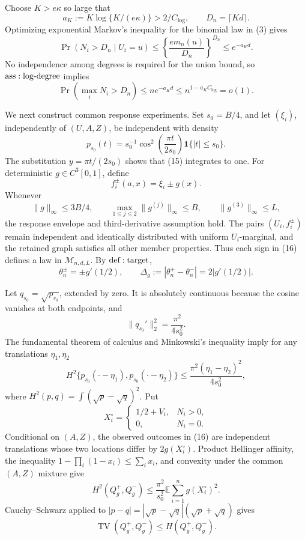 Choose \(K>e\kappa\) so large that
\[
 a_K:=K\log\{K/(e\kappa)\}>2/C_{\log},
 \qquad D_n=\lceil Kd\rceil.
\tag{13}
\]
Optimizing exponential Markov's inequality for the binomial law in (3) gives
\[
 \Pr(N_i>D_n\mid U_i=u)
 \leq\left\{\frac{em_n(u)}{D_n}\right\}^{D_n}
 \leq e^{-a_Kd}.
\]
No independence among degrees is required for the union bound, so \({\rm ass:log\text{-}degree}\) implies
\[
 \Pr\left(\max_iN_i>D_n\right)\leq ne^{-a_Kd}
 \leq n^{1-a_KC_{\log}}=o(1).
\tag{14}
\]

We next construct common response experiments.  Set \(s_0=B/4\), and let \((\xi_i)\), independently of \((U,A,Z)\), be independent with density
\[
 p_{s_0}(t)=s_0^{-1}\cos^2\!\left(\frac{\pi t}{2s_0}\right)
 \mathbf1\{|t|\leq s_0\}.
\tag{15}
\]
The substitution \(y=\pi t/(2s_0)\) shows that (15) integrates to one.  For deterministic \(g\in C^3[0,1]\), define
\[
 f_i^\pm(a,x)=\xi_i\pm g(x).
\tag{16}
\]
Whenever
\[
 \|g\|_\infty\leq3B/4,
 \qquad \max_{1\leq j\leq2}\|g^{(j)}\|_\infty\leq B,
 \qquad \|g^{(3)}\|_\infty\leq L,
\tag{17}
\]
the response envelope and third-derivative assumption hold.  The pairs \((U_i,f_i^\pm)\) remain independent and identically distributed with uniform \(U_i\)-marginal, and the retained graph satisfies all other member properties.  Thus each sign in (16) defines a law in \(\mathcal M_{n,d,L}\).  By \({\rm def:target}\),
\[
 \theta_n^\pm=\pm g'(1/2),
 \qquad \Delta_g:=|\theta_n^+-\theta_n^-|=2|g'(1/2)|.
\tag{18}
\]

Let \(q_{s_0}=\sqrt{p_{s_0}}\), extended by zero.  It is absolutely continuous because the cosine vanishes at both endpoints, and
\[
 \|q_{s_0}'\|_2^2=\frac{\pi^2}{4s_0^2}.
\tag{19}
\]
The fundamental theorem of calculus and Minkowski's inequality imply for any translations \(\eta_1,\eta_2\)
\[
 H^2\{p_{s_0}(\mathord\cdot-\eta_1),p_{s_0}(\mathord\cdot-\eta_2)\}
 \leq\frac{\pi^2(\eta_1-\eta_2)^2}{4s_0^2},
\tag{20}
\]
where \(H^2(p,q)=\int(\sqrt p-\sqrt q)^2\).  Put
\[
 X_i^\circ=\begin{cases}1/2+V_i,&N_i>0,\\0,&N_i=0.\end{cases}
\]
Conditional on \((A,Z)\), the observed outcomes in (16) are independent translations whose two locations differ by \(2g(X_i^\circ)\).  Product Hellinger affinity, the inequality \(1-\prod_i(1-x_i)\leq\sum_i x_i\), and convexity under the common \((A,Z)\) mixture give
\[
 H^2(Q_g^+,Q_g^-)
 \leq\frac{\pi^2}{s_0^2}\mathbb E\sum_{i=1}^ng(X_i^\circ)^2.
\tag{21}
\]
Cauchy--Schwarz applied to \(|p-q|=|\sqrt p-\sqrt q|(\sqrt p+\sqrt q)\) gives
\[
 \operatorname{TV}(Q_g^+,Q_g^-)\leq H(Q_g^+,Q_g^-).
\tag{22}
\]

